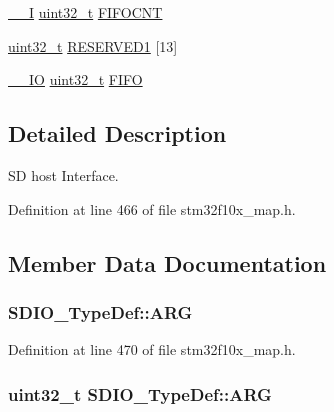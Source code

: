 \begin{DoxyCompactItemize}
\item 
\hyperlink{group___c_m_s_i_s___c_m3__core__definitions_gaf63697ed9952cc71e1225efe205f6cd3}{\+\_\+\+\_\+I} \hyperlink{_p_e___types_8h_a33594304e786b158f3fb30289278f5af}{uint32\+\_\+t} \hyperlink{struct_s_d_i_o___type_def_ae30d52b6556f5d17db8e5cfd2641e7b4}{F\+I\+F\+O\+C\+NT}
\item 
\hyperlink{_p_e___types_8h_a33594304e786b158f3fb30289278f5af}{uint32\+\_\+t} \hyperlink{struct_s_d_i_o___type_def_a4017b35303754e115249d3c75bdf6894}{R\+E\+S\+E\+R\+V\+E\+D1} \mbox{[}13\mbox{]}
\item 
\hyperlink{group___c_m_s_i_s___c_m3__core__definitions_gaec43007d9998a0a0e01faede4133d6be}{\+\_\+\+\_\+\+IO} \hyperlink{_p_e___types_8h_a33594304e786b158f3fb30289278f5af}{uint32\+\_\+t} \hyperlink{struct_s_d_i_o___type_def_ab4757027388ea3a0a6f114d7de2ed4cf}{F\+I\+FO}
\end{DoxyCompactItemize}


\subsection{Detailed Description}
SD host Interface. 

Definition at line 466 of file stm32f10x\+\_\+map.\+h.



\subsection{Member Data Documentation}
\subsubsection[{\texorpdfstring{A\+RG}{ARG}}]{ S\+D\+I\+O\+\_\+\+Type\+Def\+::\+A\+RG}\hypertarget{struct_s_d_i_o___type_def_a4f23861b179c46f4aa9b5fef9f7c2c40}{}\label{struct_s_d_i_o___type_def_a4f23861b179c46f4aa9b5fef9f7c2c40}


Definition at line 470 of file stm32f10x\+\_\+map.\+h.

\subsubsection[{\texorpdfstring{A\+RG}{ARG}}]{ {\bf uint32\+\_\+t} S\+D\+I\+O\+\_\+\+Type\+Def\+::\+A\+RG}\hypertarget{struct_s_d_i_o___type_def_a3e24392875e98cd09043e54a0990ab7a}{}\label{struct_s_d_i_o___type_def_a3e24392875e98cd09043e54a0990ab7a}


